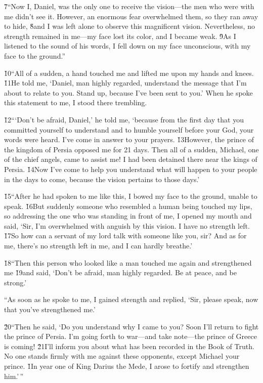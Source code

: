 \v{7}``Now I, Daniel, was the only one to receive the vision---the men who were with me didn't see it. However, an enormous fear overwhelmed them, so they ran away to hide, \v{8}and I was left alone to observe this magnificent vision. Nevertheless, no strength remained in me---my face lost its color, and I became weak. \v{9}As I listened to the sound of his words, I fell down on my face unconscious, with my face to the ground.''

\v{10}``All of a sudden, a hand touched me and lifted me upon my hands and knees. \v{11}He told me, `Daniel, man highly regarded, understand the message that I'm about to relate to you. Stand up, because I've been sent to you.' When he spoke this statement to me, I stood there trembling.

\v{12}```Don't be afraid, Daniel,' he told me, `because from the first day that you committed yourself to understand and to humble yourself before your God, your words were heard. I've come in answer to your prayers. \v{13}However, the prince of the kingdom of Persia opposed me for 21 days. Then all of a sudden, Michael, one of the chief angels, came to assist me! I had been detained there near the kings of Persia. \v{14}Now I've come to help you understand what will happen to your people in the days to come, because the vision pertains to those days.'

\v{15}``After he had spoken to me like this, I bowed my face to the ground, unable to speak. \v{16}But suddenly someone who resembled a human being touched my lips, so addressing the one who was standing in front of me, I opened my mouth and said, `Sir, I'm overwhelmed with anguish by this vision. I have no strength left. \v{17}So how can a servant of my lord talk with someone like you, sir? And as for me, there's no strength left in me, and I can hardly breathe.'

\v{18}``Then this person who looked like a man touched me again and strengthened me \v{19}and said, `Don't be afraid, man highly regarded. Be at peace, and be strong.'

``As soon as he spoke to me, I gained strength and replied, `Sir, please speak, now that you've strengthened me.'

\v{20}``Then he said, `Do you understand why I came to you? Soon I'll return to fight the prince of Persia. I'm going forth to war---and take note---the prince of Greece is coming! \v{21}I'll inform you about what has been recorded in the Book of Truth. No one stands firmly with me against these opponents, except Michael your prince.
\v{1}In year one of King Darius the Mede, I arose to fortify and strengthen him.'\,''

